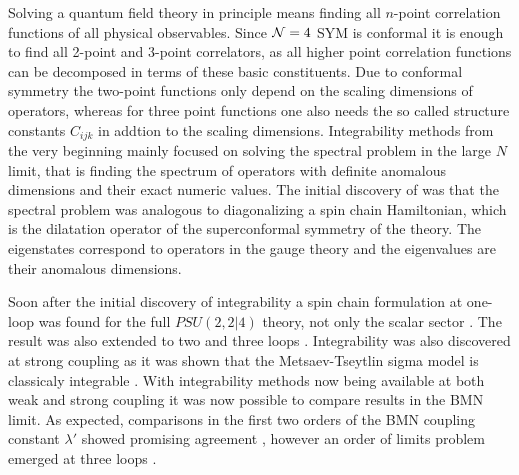 \vspace{20pt}
\vspace{20pt}

Solving a quantum field theory in principle means finding all $n$-point correlation functions of all physical observables. 
Since $\mathcal{N}=4$ SYM is conformal it is enough to find all 2-point and 3-point correlators, as all higher point correlation functions can be decomposed in terms of these basic constituents.
Due to conformal symmetry the two-point functions only depend on the scaling dimensions of operators, whereas for three point functions one also needs the so called structure constants $C_{ijk}$ in addtion to the scaling dimensions.
Integrability methods from the very beginning mainly focused on solving the spectral problem in the large $N$ limit, that is finding the spectrum of operators with definite anomalous dimensions and their exact numeric values.
The initial discovery of \cite{Minahan:2002ve} was that the spectral problem was analogous to diagonalizing a spin chain Hamiltonian, which is the dilatation operator of the superconformal symmetry of the theory.
The eigenstates correspond to operators in the gauge theory and the eigenvalues are their anomalous dimensions.

Soon after the initial discovery of integrability a spin chain formulation at one-loop was found for the full $PSU(2,2|4)$ theory, not only the scalar sector \cite{Beisert:2003jj}. 
The result was also extended to two and three loops \cite{Beisert:2003tq}. 
Integrability was also discovered at strong coupling as it was shown that the Metsaev-Tseytlin sigma model is classicaly integrable \cite{Bena:2003wd}. 
With integrability methods now being available at both weak and strong coupling it was now possible to compare results in the BMN limit.
As expected, comparisons in the first two orders of the BMN coupling constant $\lambda'$ showed promising agreement \cite{Frolov:2003qc, Frolov:2003xy, Arutyunov:2003uj}, however an order of limits problem emerged at three loops \cite{Beisert:2003tq}. 

